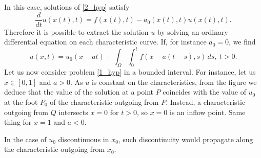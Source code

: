 In this case, solutions of \eqref{2_hyp} satisfy
\[
    \frac{d}{dt} u(x(t), t) = f(x(t), t) - a_0(x(t),t)u(x(t),t).
\]
Therefore it is possible to extract the solution \(u\) by solving an ordinary differential equation on each characteristic curve. If, for instance \(a_0 = 0\), we find 
\[
    u(x,t) = u_0(x-at) + \int_\Omega \int_0^t f(x-a(t-s),s) \, ds, \ t > 0.
\]
Let us now consider problem \eqref{1_hyp} in a bounded interval. For instance, let us \(x \in [0,1]\) and \(a > 0\). As \(u\) is constant on the characteristics, from the figure we deduce that the value of the solution at a point \(P\) coincides with the value of \(u_0\) at the foot \(P_0\) of the characteristic outgoing from \(P\). Instead, a characteristic outgoing from \(Q\) intersects \(x=0\) for \(t>0\), so \(x=0\) is an inflow point. Same thing for \(x=1\) and \(a<0\).

In the case of \(u_0\) discontinuous in \(x_0\), such discontinuity would propagate along the characteristic outgoing from \(x_0\).